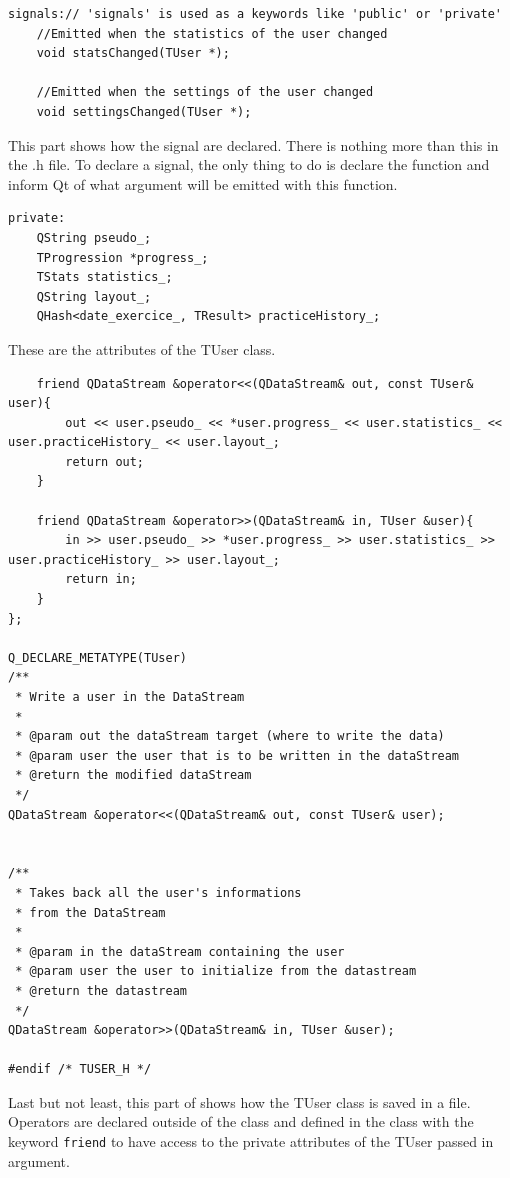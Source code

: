 \begin{lstlisting}
signals:// 'signals' is used as a keywords like 'public' or 'private'
	//Emitted when the statistics of the user changed
    void statsChanged(TUser *);

	//Emitted when the settings of the user changed
    void settingsChanged(TUser *);
\end{lstlisting}
This part shows how the signal are declared. There is nothing more than this in the .h file. To declare a signal, the only thing to do is declare the function and inform Qt of what argument will be emitted with this function.

\begin{lstlisting}
private:
    QString pseudo_;
    TProgression *progress_;
    TStats statistics_;
    QString layout_;
	QHash<date_exercice_, TResult> practiceHistory_;
\end{lstlisting}
These are the attributes of the TUser class.

\begin{lstlisting}
    friend QDataStream &operator<<(QDataStream& out, const TUser& user){
        out << user.pseudo_ << *user.progress_ << user.statistics_ << user.practiceHistory_ << user.layout_;
        return out;
    }

    friend QDataStream &operator>>(QDataStream& in, TUser &user){
        in >> user.pseudo_ >> *user.progress_ >> user.statistics_ >> user.practiceHistory_ >> user.layout_;
        return in;
    }
};

Q_DECLARE_METATYPE(TUser)
/**
 * Write a user in the DataStream
 * 
 * @param out the dataStream target (where to write the data)
 * @param user the user that is to be written in the dataStream
 * @return the modified dataStream
 */
QDataStream &operator<<(QDataStream& out, const TUser& user);


/**
 * Takes back all the user's informations
 * from the DataStream
 * 
 * @param in the dataStream containing the user
 * @param user the user to initialize from the datastream
 * @return the datastream
 */
QDataStream &operator>>(QDataStream& in, TUser &user);

#endif /* TUSER_H */

\end{lstlisting}
Last but not least, this part of shows how the TUser class is saved in a file. Operators are declared outside of the class and defined in the class with the keyword \texttt{friend} to have access to the private attributes of the TUser passed in argument.

